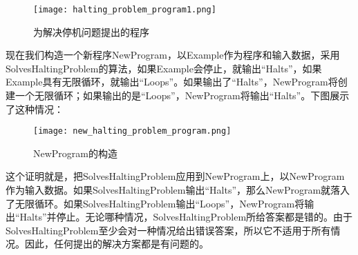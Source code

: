 \begin{figure}[!h]
\centering
\texttt{[image: halting\_problem\_program1.png]}
\caption{为解决停机问题提出的程序}
\end{figure}

现在我们构造一个新程序NewProgram，以Example作为程序和输入数据，采用SolvesHaltingProblem的算法，如果Example会停止，就输出“Halts”，如果Example具有无限循环，就输出“Loops”。如果输出了“Halts”，NewProgram将创建一个无限循环；如果输出的是“Loops”，NewProgram将输出“Halts”。下图展示了这种情况：

\begin{figure}[!h]
\centering
\texttt{[image: new\_halting\_problem\_program.png]}
\caption{NewProgram的构造}
\end{figure}

这个证明就是，把SolvesHaltingProblem应用到NewProgram上，以NewProgram作为输入数据。如果SolvesHaltingProblem输出“Halts”，那么NewProgram就落入了无限循环。如果SolvesHaltingProblem输出“Loops”，NewProgram将输出“Halts”并停止。无论哪种情况，SolvesHaltingProblem所给答案都是错的。由于SolvesHaltingProblem至少会对一种情况给出错误答案，所以它不适用于所有情况。因此，任何提出的解决方案都是有问题的。

\clearpage
























